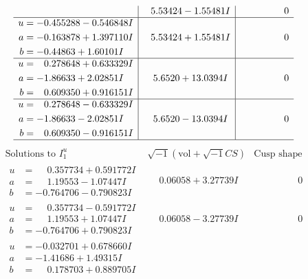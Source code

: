 \documentclass[1p]{elsarticle_modified}
\theoremstyle{definition}
\newcommand{\I}{\sqrt{-1}}
\begin{document}
$$\begin{array}{c|c|c}
 & \phantom{-}5.53424 - 1.55481 I & \phantom{-0.000000 } 0 \\ \hline\begin{aligned}
u &= -0.455288 - 0.546848 I \\
a &= -0.163878 + 1.397110 I \\
b &= -0.44863 + 1.60101 I\end{aligned}
 & \phantom{-}5.53424 + 1.55481 I & \phantom{-0.000000 } 0 \\ \hline\begin{aligned}
u &= \phantom{-}0.278648 + 0.633329 I \\
a &= -1.86633 + 2.02851 I \\
b &= \phantom{-}0.609350 + 0.916151 I\end{aligned}
 & \phantom{-}5.6520 + 13.0394 I & \phantom{-0.000000 } 0 \\ \hline\begin{aligned}
u &= \phantom{-}0.278648 - 0.633329 I \\
a &= -1.86633 - 2.02851 I \\
b &= \phantom{-}0.609350 - 0.916151 I\end{aligned}
 & \phantom{-}5.6520 - 13.0394 I & \phantom{-0.000000 } 0\\
 \hline 
 \end{array}$$\newpage$$\begin{array}{c|c|c}  
\text{Solutions to }I^u_{1}& \I (\text{vol} + \sqrt{-1}CS) & \text{Cusp shape}\\
 \hline 
\begin{aligned}
u &= \phantom{-}0.357734 + 0.591772 I \\
a &= \phantom{-}1.19553 - 1.07447 I \\
b &= -0.764706 - 0.790823 I\end{aligned}
 & \phantom{-}0.06058 + 3.27739 I & \phantom{-0.000000 } 0 \\ \hline\begin{aligned}
u &= \phantom{-}0.357734 - 0.591772 I \\
a &= \phantom{-}1.19553 + 1.07447 I \\
b &= -0.764706 + 0.790823 I\end{aligned}
 & \phantom{-}0.06058 - 3.27739 I & \phantom{-0.000000 } 0 \\ \hline\begin{aligned}
u &= -0.032701 + 0.678660 I \\
a &= -1.41686 + 1.49315 I \\
b &= \phantom{-}0.178703 + 0.889705 I\end{aligned}

\end{array}$$
\end{document}
